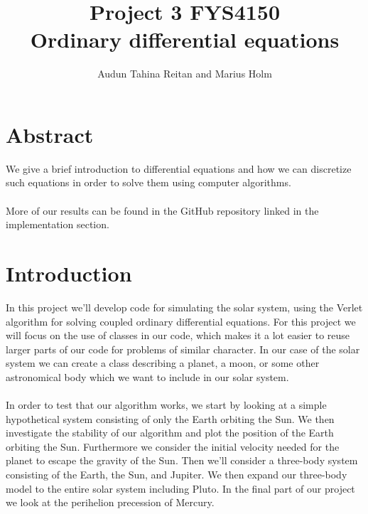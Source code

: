 \documentclass[a4paper, fontsize=11pt]{article}
\begin{document}
\title{Project 3 FYS4150 \\ Ordinary differential equations}
\author{Audun Tahina Reitan and Marius Holm}

\maketitle


\section{Abstract}
We give a brief introduction to differential equations and how we can discretize such equations in order to solve them using computer algorithms. 

\paragraph{}
More of our results can be found in the GitHub repository linked in the implementation section. 

\section{Introduction}
In this project we'll develop code for simulating the solar system, using the Verlet algorithm for solving coupled ordinary differential equations. For this project we will focus on the use of classes in our code, which makes it a lot easier to reuse larger parts of our code for problems of similar character. In our case of the solar system we can create a class describing a planet, a moon, or some other astronomical body which we want to include in our solar system.


\paragraph{}
In order to test that our algorithm works, we start by looking at a simple hypothetical system consisting of only the Earth orbiting the Sun. We then investigate the stability of our algorithm and plot the position of the Earth orbiting the Sun. Furthermore we consider the initial velocity needed for the planet to escape the gravity of the Sun. Then we'll consider a three-body system consisting of the Earth, the Sun, and Jupiter. We then expand our three-body model to the entire solar system including Pluto. In the final part of our project we look at the perihelion precession of Mercury.
\end{document}

